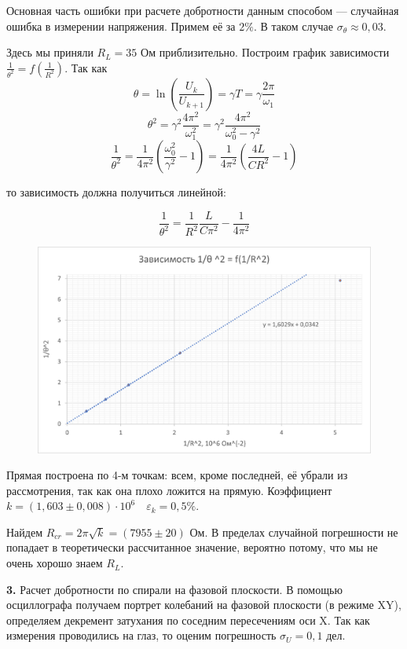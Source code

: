 \documentclass[a4paper, 12pt]{article}
\begin{document}
        Основная часть ошибки при расчете добротности данным способом --- случайная ошибка в измерении напряжения. Примем её за $2\%$. В таком случае $\sigma_{\theta} \approx 0,03$.

        Здесь мы приняли $R_L = 35$ Ом приблизительно.
        Построим график зависимости $\frac{1}{\theta^2} = f(\frac{1}{R^2})$. Так как
        \[\theta = \ln\left(\frac{U_k}{U_{k + 1}}\right) = \gamma T = \gamma \frac{2\pi}{\omega_1}\]
        \[\theta^2 = \gamma^2\frac{4\pi^2}{\omega_1^2} = \gamma^2 \frac{4\pi^2}{\omega_0^2 - \gamma^2}\]
        \[\frac{1}{\theta^2} = \frac{1}{4\pi^2}\left(\frac{\omega_0^2}{\gamma^2} - 1\right) = \frac{1}{4\pi^2}\left(\frac{4L}{CR^2} - 1\right)\]

        то зависимость должна получиться линейной:

        \[\frac{1}{\theta^2} = \frac{1}{R^2}\frac{L}{C\pi^2} - \frac{1}{4\pi^2}\]
        \begin{figure}[h]
            \centering
            \includegraphics[width = \textwidth]{img/Gr2.png}
        \end{figure}


        Прямая построена по 4-м точкам: всем, кроме последней, её убрали из рассмотрения, так как она плохо ложится на прямую. Коэффициент $k = (1,603 \pm 0,008)\cdot 10^6 \quad \varepsilon_k = 0,5 \%$.

        Найдем $R_{cr} = 2\pi \sqrt{k} = (7955 \pm 20)$ Ом. В пределах случайной погрешности не попадает в теоретически рассчитанное значение, вероятно потому, что мы не очень хорошо знаем $R_L$.

        \textbf{3.} Расчет добротности по спирали на фазовой плоскости. В помощью осциллографа получаем портрет колебаний на фазовой плоскости (в режиме XY), определяем декремент затухания по соседним пересечениям оси X. Так как измерения проводились на глаз, то оценим погрешность $\sigma_U = 0,1$ дел.
\end{document}

